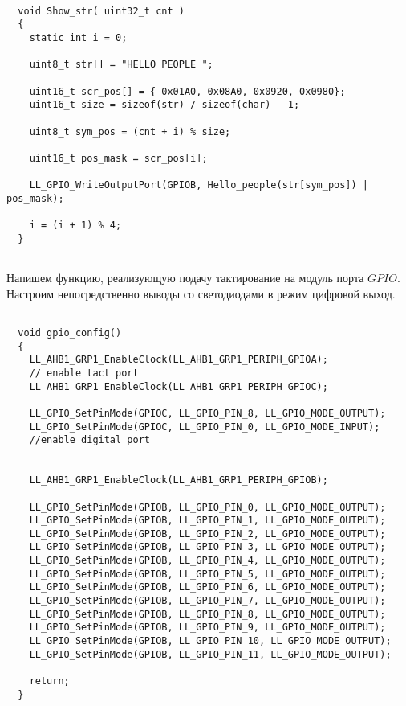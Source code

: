   \begin{verbatim}
      
  void Show_str( uint32_t cnt )
  {
    static int i = 0;
  
    uint8_t str[] = "HELLO PEOPLE ";
    
    uint16_t scr_pos[] = { 0x01A0, 0x08A0, 0x0920, 0x0980};
    uint16_t size = sizeof(str) / sizeof(char) - 1;
  
    uint8_t sym_pos = (cnt + i) % size;
   
    uint16_t pos_mask = scr_pos[i];
  
    LL_GPIO_WriteOutputPort(GPIOB, Hello_people(str[sym_pos]) | pos_mask);
    
    i = (i + 1) % 4;
  }
  
  \end{verbatim}
  
  Напишем функцию, реализующую подачу тактирование на модуль порта $GPIO$. Настроим непосредственно выводы со светодиодами в режим цифровой выход.
  
  \begin{verbatim}
      
  void gpio_config()
  {  
    LL_AHB1_GRP1_EnableClock(LL_AHB1_GRP1_PERIPH_GPIOA); 
    // enable tact port
    LL_AHB1_GRP1_EnableClock(LL_AHB1_GRP1_PERIPH_GPIOC);
    
    LL_GPIO_SetPinMode(GPIOC, LL_GPIO_PIN_8, LL_GPIO_MODE_OUTPUT);
    LL_GPIO_SetPinMode(GPIOC, LL_GPIO_PIN_0, LL_GPIO_MODE_INPUT); 
    //enable digital port
  
    
    LL_AHB1_GRP1_EnableClock(LL_AHB1_GRP1_PERIPH_GPIOB);
      
    LL_GPIO_SetPinMode(GPIOB, LL_GPIO_PIN_0, LL_GPIO_MODE_OUTPUT);
    LL_GPIO_SetPinMode(GPIOB, LL_GPIO_PIN_1, LL_GPIO_MODE_OUTPUT);
    LL_GPIO_SetPinMode(GPIOB, LL_GPIO_PIN_2, LL_GPIO_MODE_OUTPUT);
    LL_GPIO_SetPinMode(GPIOB, LL_GPIO_PIN_3, LL_GPIO_MODE_OUTPUT);
    LL_GPIO_SetPinMode(GPIOB, LL_GPIO_PIN_4, LL_GPIO_MODE_OUTPUT);
    LL_GPIO_SetPinMode(GPIOB, LL_GPIO_PIN_5, LL_GPIO_MODE_OUTPUT);
    LL_GPIO_SetPinMode(GPIOB, LL_GPIO_PIN_6, LL_GPIO_MODE_OUTPUT);
    LL_GPIO_SetPinMode(GPIOB, LL_GPIO_PIN_7, LL_GPIO_MODE_OUTPUT);
    LL_GPIO_SetPinMode(GPIOB, LL_GPIO_PIN_8, LL_GPIO_MODE_OUTPUT);
    LL_GPIO_SetPinMode(GPIOB, LL_GPIO_PIN_9, LL_GPIO_MODE_OUTPUT);
    LL_GPIO_SetPinMode(GPIOB, LL_GPIO_PIN_10, LL_GPIO_MODE_OUTPUT);
    LL_GPIO_SetPinMode(GPIOB, LL_GPIO_PIN_11, LL_GPIO_MODE_OUTPUT);
  
    return;
  }
  
  \end{verbatim}
  
